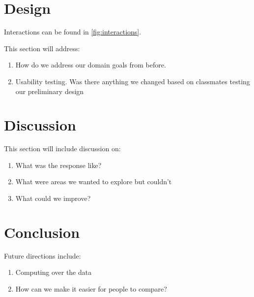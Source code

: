 \documentclass[journal]{vgtc}                %
\begin{document}
\section{Design}

Interactions can be found in \autoref{fig:interactions}.

This section will address:
\begin{enumerate}
  \item How do we address our domain goals from before.
  \item Usability testing. Was there anything we changed based on classmates testing our preliminary design
\end{enumerate}

\section{Discussion}
This section will include discussion on:
\begin{enumerate}
  \item What was the response like?
  \item What were areas we wanted to explore but couldn't
  \item What could we improve?
\end{enumerate}

\section{Conclusion}

Future directions include:
\begin{enumerate}
  \item Computing over the data
  \item How can we make it easier for people to compare?
\end{enumerate}


%

%
%
%


\end{document}

